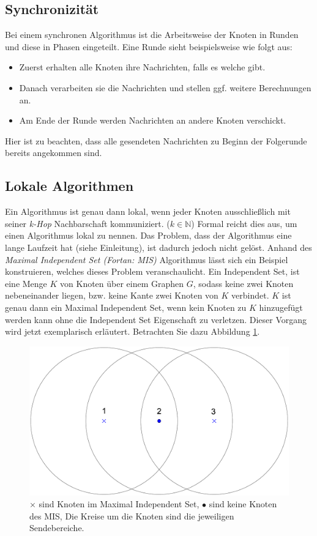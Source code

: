 \documentclass[a4paper,twoside]{IEEEtran}
\begin{document}
\subsection{Synchronizität}
Bei einem synchronen Algorithmus ist die Arbeitsweise der Knoten in Runden und diese in Phasen eingeteilt. 
Eine Runde sieht beispielsweise wie folgt aus:
\begin{itemize}
\item Zuerst erhalten alle Knoten ihre Nachrichten, falls es welche gibt.
\item Danach verarbeiten sie die Nachrichten und stellen ggf. weitere Berechnungen an.
\item Am Ende der Runde werden Nachrichten an andere Knoten verschickt.
\end{itemize}
Hier ist zu beachten, dass alle gesendeten Nachrichten zu Beginn der Folgerunde bereits angekommen sind.

\subsection{Lokale Algorithmen} \label{lokal}
Ein Algorithmus ist genau dann lokal, wenn jeder Knoten ausschließlich mit seiner \emph{k-Hop} Nachbarschaft kommuniziert. ($k \in \mathds{N}$)
Formal reicht dies aus, um einen Algorithmus lokal zu nennen.
Das Problem, dass der Algorithmus eine lange Laufzeit hat (siehe Einleitung), ist dadurch jedoch nicht gelöst.
Anhand des \emph{Maximal Independent Set (Fortan: MIS)} Algorithmus lässt sich ein Beispiel konstruieren, welches dieses Problem veranschaulicht.
Ein Independent Set, ist eine Menge $K $ von Knoten über einem Graphen $G $, sodass keine zwei Knoten nebeneinander liegen, bzw. keine Kante zwei Knoten von $K $ verbindet.
$K $ ist genau dann ein Maximal Independent Set, wenn kein Knoten zu $K $ hinzugefügt werden kann ohne die Independent Set Eigenschaft zu verletzen.
Dieser Vorgang wird jetzt exemplarisch erläutert.
Betrachten Sie dazu Abbildung \ref{fig:MIS}.

\begin{figure}[h!]
\centering
\includegraphics[width=0.99\linewidth]{MIS.eps}
\caption{$\times $ sind Knoten im Maximal Independent Set, $\bullet $ sind keine Knoten des MIS, Die Kreise um die Knoten sind die jeweiligen Sendebereiche.}
\label{fig:MIS}
\end{figure}
\end{document}
